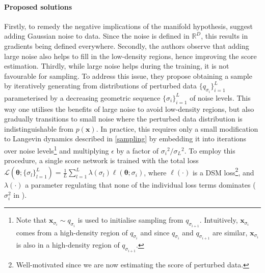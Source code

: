 \paragraph{Proposed solutions}
Firstly, to remedy the negative implications of the manifold hypothesis, \citet{ncsn-paper} suggest adding Gaussian noise to data. Since the noise is defined in $\mathbb{R}^D$, this results in gradients being defined everywhere. Secondly, the authors observe that adding large noise also helps to fill in the low-density regions, hence improving the score estimation. Thirdly, while large noise helps during the training, it is not favourable for sampling. To address this issue, they propose obtaining a sample by iteratively generating from distributions of perturbed data $\{q_{\sigma_i}\}_{i=1}^L$ parameterised by a decreasing geometric sequence $\{\sigma_i\}_{i=1}^L$ of noise levels. This way one utilises the benefits of large noise to avoid low-density regions, but also gradually transitions to small noise where the perturbed data distribution is indistinguishable from $p(\mathbf{x})$. In practice, this requires only a small modification to Langevin dynamics described in \autoref{sampling} by embedding it into iterations over noise levels\footnote{Note that $\mathbf{x}_{\sigma_i} \sim q_{\sigma_i}$ is used to initialise sampling from $q_{\sigma_{i+1}}$. Intuitively, $\mathbf{x}_{\sigma_i}$ comes from a high-density region of $q_{\sigma_i}$ and since $q_{\sigma_i}$ and $q_{\sigma_{i+1}}$ are similar, $\mathbf{x}_{\sigma_i}$ is also in a high-density region of $q_{\sigma_{i+1}}$.} and multiplying $\epsilon$ by a factor of ${\sigma_i}^2/{\sigma_L}^2$. To employ this procedure, a single score network is trained with the total loss $\mathcal{L}(\bm{\theta}; \{\sigma_l\}_{l=1}^L) = \frac{1}{L}\sum_{l=1}^L \lambda(\sigma_l) \ell (\bm{\theta}; \sigma_i)$, where $\ell(\cdot)$ is a DSM loss\footnote{Well-motivated since we are now estimating the score of perturbed data.}, and $\lambda(\cdot)$ a parameter regulating that none of the individual loss terms dominates ($\sigma_i^2$ in \cite{ncsn-paper}).

